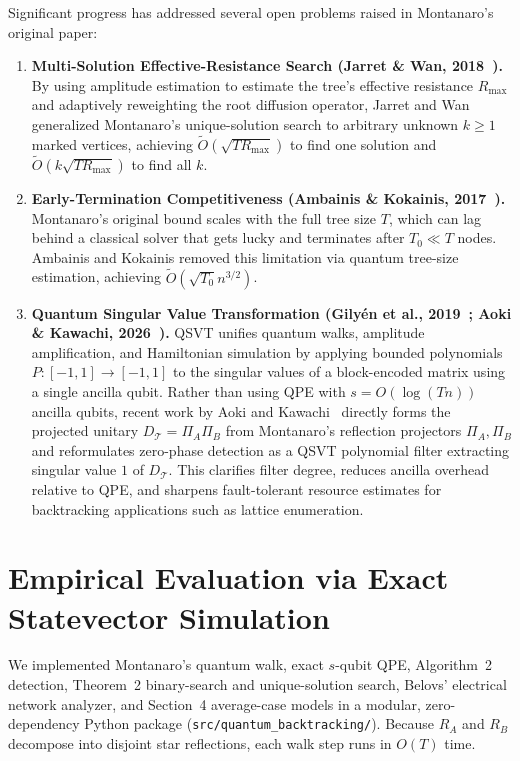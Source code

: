 \documentclass[11pt,a4paper]{article}
\begin{document}
Significant progress has addressed several open problems raised in Montanaro's original paper:
\begin{enumerate}
    \item \textbf{Multi-Solution Effective-Resistance Search (Jarret \& Wan, 2018~\cite{jarret2018}).} By using amplitude estimation to estimate the tree's effective resistance $R_{\max}$ and adaptively reweighting the root diffusion operator, Jarret and Wan generalized Montanaro's unique-solution search to arbitrary unknown $k \ge 1$ marked vertices, achieving $\tilde{O}(\sqrt{T R_{\max}})$ to find one solution and $\tilde{O}(k\sqrt{T R_{\max}})$ to find all $k$.
    \item \textbf{Early-Termination Competitiveness (Ambainis \& Kokainis, 2017~\cite{ambainis2017}).} Montanaro's original bound scales with the full tree size $T$, which can lag behind a classical solver that gets lucky and terminates after $T_0 \ll T$ nodes. Ambainis and Kokainis removed this limitation via quantum tree-size estimation, achieving $\tilde{O}(\sqrt{T_0} n^{3/2})$.
    \item \textbf{Quantum Singular Value Transformation (Gily\'en et al., 2019~\cite{gilyen2019}; Aoki \& Kawachi, 2026~\cite{aoki2026}).} QSVT unifies quantum walks, amplitude amplification, and Hamiltonian simulation by applying bounded polynomials $P : [-1, 1] \to [-1, 1]$ to the singular values of a block-encoded matrix using a single ancilla qubit. Rather than using QPE with $s = O(\log(Tn))$ ancilla qubits, recent work by Aoki and Kawachi~\cite{aoki2026} directly forms the projected unitary $D_{\mathcal{T}} = \Pi_A \Pi_B$ from Montanaro's reflection projectors $\Pi_A, \Pi_B$ and reformulates zero-phase detection as a QSVT polynomial filter extracting singular value $1$ of $D_{\mathcal{T}}$. This clarifies filter degree, reduces ancilla overhead relative to QPE, and sharpens fault-tolerant resource estimates for backtracking applications such as lattice enumeration.
\end{enumerate}

\section{Empirical Evaluation via Exact Statevector Simulation}

We implemented Montanaro's quantum walk, exact $s$-qubit QPE, Algorithm~2 detection, Theorem~2 binary-search and unique-solution search, Belovs' electrical network analyzer, and Section~4 average-case models in a modular, zero-dependency Python package (\texttt{src/quantum\_backtracking/}). Because $R_A$ and $R_B$ decompose into disjoint star reflections, each walk step runs in $O(T)$ time.
\end{document}

